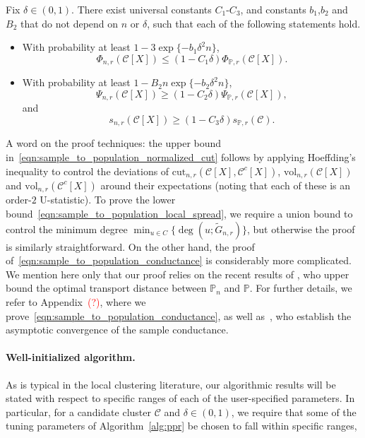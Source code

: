\documentclass[11pt,twoside]{article}
\newcommand{\1}{\mathbf{1}}
\newcommand{\mc}[1]{\mathcal{#1}}
\newcommand{\Pbb}{\mathbb{P}}
\newcommand{\wt}[1]{\widetilde{#1}}
\newcommand{\vol}{\mathrm{vol}}
\newcommand{\cut}{\mathrm{cut}}
\begin{document}
\begin{proposition}
	\label{prop:sample_to_population}
	Fix $\delta \in (0,1)$. There exist universal constants $C_1$-$C_3$, and constants $b_1$,$b_2$ and $B_2$ that do not depend on $n$ or $\delta$, such that each of the following statements hold.
	\begin{itemize}
		\item With probability at least $1 - 3\exp\{-b_1\delta^2n\}$,
		\begin{equation}
		\label{eqn:sample_to_population_normalized_cut}
		\Phi_{n,r}(\mc{C}[X]) \leq (1 - C_1\delta) \Phi_{\Pbb,r}(\mc{C}[X]).
		\end{equation}
		\item With probability at least $1 - B_2n\exp\{-b_2\delta^2n\}$,
		\begin{equation}
		\label{eqn:sample_to_population_conductance}
		\Psi_{n,r}(\mc{C}[X]) \geq (1 - C_2\delta) \Psi_{\Pbb,r}(\mc{C}[X]),
		\end{equation}
		and 
		\begin{equation}
		\label{eqn:sample_to_population_local_spread}
		s_{n,r}(\mc{C}[X]) \geq (1 - C_3\delta) s_{\Pbb,r}(\mc{C}).
		\end{equation}
	\end{itemize}
\end{proposition}
A word on the proof techniques: the upper bound in~\eqref{eqn:sample_to_population_normalized_cut} follows by applying Hoeffding's inequality to control the deviations of $\cut_{n,r}(\mc{C}[X],\mc{C}^c[X])$, $\vol_{n,r}(\mc{C}[X])$ and $\vol_{n,r}(\mc{C}^c[X])$ around their expectations (noting that each of these is an order-$2$ U-statistic). To prove the lower bound~\eqref{eqn:sample_to_population_local_spread}, we require a union bound to control the minimum degree $\min_{u \in C} \{\deg(u;\wt{G}_{n,r})\}$, but otherwise the proof is similarly straightforward. On the other hand, the proof of~\eqref{eqn:sample_to_population_conductance} is considerably more complicated. We mention here only that our proof relies on the recent results of \citep{garciatrillos16b}, who upper bound the optimal transport distance between $\mathbb{P}_n$ and $\mathbb{P}$. For further details, we refer to Appendix~\textcolor{red}{(?)}, where we prove~\eqref{eqn:sample_to_population_conductance}, as well as~\citep{garciatrillos16}, who establish the asymptotic convergence of the sample conductance.


\paragraph{Well-initialized algorithm.} As is typical in the local clustering literature, our algorithmic results will be stated with respect to specific ranges of each of the user-specified
parameters. In particular, for a candidate cluster $\mc{C}$ and $\delta \in (0,1)$, we require that some of the tuning parameters of Algorithm~\ref{alg:ppr} be chosen to fall within specific ranges, 
\end{document}
